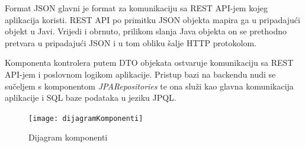 			Format JSON glavni je format za komunikaciju sa REST API-jem kojeg aplikacija koristi.
			REST API po primitku JSON objekta mapira ga u pripadajući objekt u Javi. Vrijedi i obrnuto, prilikom slanja Java objekta on se prethodno pretvara u pripadajući JSON i u tom obliku šalje HTTP protokolom.
			
			
			Komponenta kontrolera putem DTO objekata ostvaruje komunikaciju sa REST API-jem i poslovnom logikom aplikacije.
			Pristup bazi na backendu nudi se sučeljem s komponentom \textit{JPARepositories} 
			te ona služi kao glavna komunikacija aplikacije i SQL baze podataka u jeziku JPQL.
			
			 \begin{figure}[H]
			 	\texttt{[image: dijagramKomponenti]}
			 	\caption{Dijagram komponenti}
			 \end{figure} 
			
